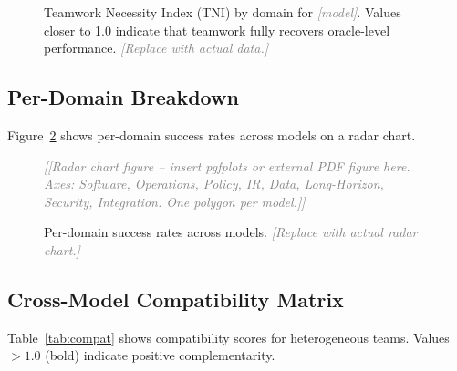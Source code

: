 \documentclass{article}
\newcommand{\tni}{\textsc{TNI}}
\newcommand{\placeholder}[1]{\textcolor{gray}{\textit{[#1]}}}
\begin{document}
\begin{figure}[h]
\centering
\caption{Teamwork Necessity Index (\tni{}) by domain for
  \placeholder{model}. Values closer to 1.0 indicate that teamwork
  fully recovers oracle-level performance. \placeholder{Replace with
  actual data.}}
\label{fig:tni}
\end{figure}

\subsection{Per-Domain Breakdown}
\label{sec:results:domain}

Figure~\ref{fig:radar} shows per-domain success rates across models on a
radar chart.

\begin{figure}[h]
\centering
\placeholder{[Radar chart figure -- insert pgfplots or external PDF figure
here. Axes: Software, Operations, Policy, IR, Data, Long-Horizon, Security,
Integration. One polygon per model.]}
\caption{Per-domain success rates across models. \placeholder{Replace with
  actual radar chart.}}
\label{fig:radar}
\end{figure}

\subsection{Cross-Model Compatibility Matrix}
\label{sec:results:compat}

Table~\ref{tab:compat} shows compatibility scores for heterogeneous teams.
Values $>1.0$ (bold) indicate positive complementarity.
\end{document}
